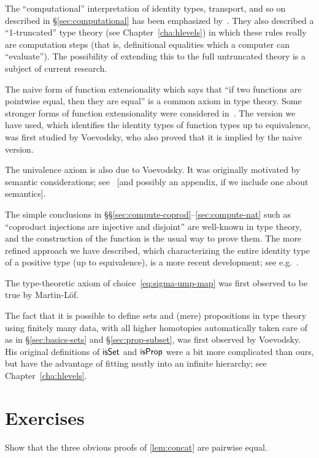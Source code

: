 The ``computational'' interpretation of identity types, transport, and so on described in \S\ref{sec:computational} has been emphasized by~\cite{lh:canonicity}.
They also described a ``1-truncated'' type theory (see Chapter~\ref{cha:hlevels}) in which these rules really are computation steps (that is, definitional equalities which a computer can ``evaluate'').
The possibility of extending this to the full untruncated theory is a subject of current research.

The naive form of function extensionality which says that ``if two functions are pointwise equal, then they are equal'' is a common axiom in type theory.
Some stronger forms of function extensionality were considered in~\cite{garner:depprod}.
The version we have used, which identifies the identity types of function types up to equivalence, was first studied by Voevodsky, who also proved that it is implied by the naive version.

The univalence axiom is also due to Voevodsky.
It was originally motivated by semantic considerations; see~\cite{klv:ssetmodel} [and possibly an appendix, if we include one about semantics].

The simple conclusions in \S\S\ref{sec:compute-coprod}--\ref{sec:compute-nat} such as ``coproduct injections are injective and disjoint'' are well-known in type theory, and the construction of the function \encode is the usual way to prove them.
The more refined approach we have described, which characterizing the entire identity type of a positive type (up to equivalence), is a more recent development; see e.g.~\cite{ls:pi1s1}.

The type-theoretic axiom of choice~\eqref{eq:sigma-ump-map} was first observed to be true by Martin-L\"of.

The fact that it is possible to define sets and (mere) propositions in type theory using finitely many data, with all higher homotopies automatically taken care of as in \S\ref{sec:basics-sets} and \S\ref{sec:prop-subset}, was first observed by Voevodsky.
His original definitions of $\mathsf{isSet}$ and $\mathsf{isProp}$ were a bit more complicated than ours, but have the advantage of fitting neatly into an infinite hierarchy; see Chapter~\ref{cha:hlevels}.


\section*{Exercises}
\label{basics:exercises}

\begin{ex}\label{ex:basics:concat}
  Show that the three obvious proofs of \autoref{lem:concat} are pairwise equal.
\end{ex}

